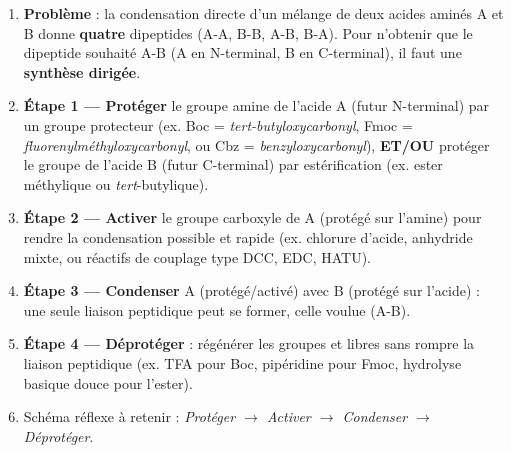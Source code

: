 \documentclass[11pt]{article}
\newcommand{\cle}[1]{{\popxbold\color{popdark}#1}}
\begin{document}
\begin{methode}
\begin{enumerate}
\item \textbf{Problème} : la condensation directe d'un mélange de deux acides aminés A et B donne \textbf{quatre} dipeptides (A-A, B-B, A-B, B-A). Pour n'obtenir que le dipeptide souhaité A-B (A en N-terminal, B en C-terminal), il faut une \textbf{synthèse dirigée}.
\item \textbf{Étape 1 — Protéger} le groupe amine  de l'acide A (futur N-terminal) par un groupe protecteur (ex. \cle{Boc} = \textit{tert-butyloxycarbonyl}, \cle{Fmoc} = \textit{fluorenylméthyloxycarbonyl}, ou \cle{Cbz} = \textit{benzyloxycarbonyl}), \textbf{ET/OU} protéger le groupe  de l'acide B (futur C-terminal) par estérification (ex. ester méthylique ou \textit{tert}-butylique).
\item \textbf{Étape 2 — Activer} le groupe carboxyle de A (protégé sur l'amine) pour rendre la condensation possible et rapide (ex. chlorure d'acide, anhydride mixte, ou réactifs de couplage type DCC, EDC, HATU).
\item \textbf{Étape 3 — Condenser} A (protégé/activé) avec B (protégé sur l'acide) : une seule liaison peptidique peut se former, celle voulue (A-B).
\item \textbf{Étape 4 — Déprotéger} : régénérer les groupes  et  libres sans rompre la liaison peptidique (ex. TFA pour Boc, pipéridine pour Fmoc, hydrolyse basique douce pour l'ester).
\item Schéma réflexe à retenir : \emph{Protéger $\rightarrow$ Activer $\rightarrow$ Condenser $\rightarrow$ Déprotéger}.
\end{enumerate}
\end{methode}
\end{document}
